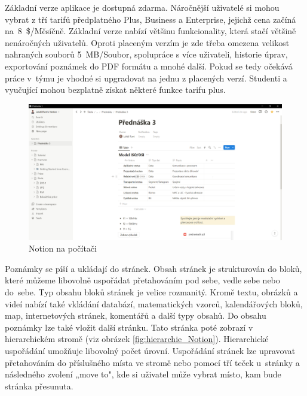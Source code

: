 \documentclass[czech, bc, kiv, he, iso690numb]{fasthesis}
\begin{document}
Základní verze aplikace je dostupná zdarma. Náročnější uživatelé si mohou vybrat z tří tarifů předplatného Plus, Business a Enterprise, jejichž cena začíná na~8~\$/Měsíčně. Základní verze nabízí většinu funkcionality, která stačí většině nenáročných uživatelů. Oproti placeným verzím je zde třeba omezena velikost nahraných souborů 5~MB/Soubor, spolupráce s více uživateli, historie úprav, exportování poznámek do PDF formátu a mnohé další. Pokud se tedy očekává práce v~týmu je vhodné si upgradovat na jednu z placených verzí. Studenti a vyučující mohou bezplatně získat některé funkce tarifu plus.

\begin{figure}[h!]
  \centering
  \includegraphics[width=1\textwidth]{img/BP-Runt/Notion/Notion_PC.png}
  \caption{Notion na počítači}
  \label{fig:notion_pc}
\end{figure}

Poznámky se píší a ukládají do stránek. Obsah stránek je strukturován do bloků, které můžeme libovolně uspořádat přetahováním pod sebe, vedle sebe nebo do~sebe. Typ obsahu bloků stránek je velice rozmanitý. Kromě textu, obrázků a videí nabízí také vkládání databází, matematických vzorců, kalendářových bloků, map, internetových stránek, komentářů a další typy obsahů. Do obsahu poznámky lze také vložit další stránku. Tato stránka poté zobrazí v hierarchickém stromě (viz obrázek \ref{fig:hierarchie_Notion}). Hierarchické uspořádání umožňuje libovolný počet úrovní. Uspořádání stránek lze upravovat přetahováním do příslušného místa ve stromě nebo pomocí tří teček u~stránky a následného zvolení „move to", kde si uživatel může vybrat místo, kam bude stránka přesunuta.
\end{document}
